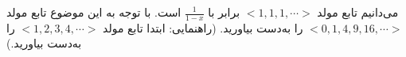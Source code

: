 \EXERCISE
می‌دانیم تابع مولد
$<1, 1, 1, \cdots>$
برابر با
$\frac{1}{1-x}$
است. با توجه به این موضوع تابع مولد
$<0, 1, 4, 9, 16, \cdots>$
را به‌دست بیاورید. (راهنمایی: ابتدا تابع مولد
$<1, 2, 3, 4, \cdots>$
را به‌دست بیاورید.)